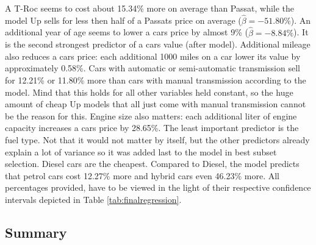 \documentclass[12 pt]{scrartcl}
\begin{document}
A T-Roc seems to cost about 15.34\% more on average than Passat, while the model Up sells for less then half of a Passats price on average ($\hat{\beta} = -51.80\%$). An additional year of age seems to lower a cars price by almost 9\% ($\hat{\beta} = -8.84\%$). It is the second strongest predictor of a cars value (after model). Additional mileage also reduces a cars price: each additional 1000 miles on a car lower its value by approximately 0.58\%. Cars with
automatic or semi-automatic transmission sell for 12.21\% or 11.80\% more than cars with manual transmission according to the model. Mind that this holds for all other variables held constant, so the huge amount of cheap Up models that all just come with manual transmission cannot be the reason for this.
Engine size also matters: each additional liter of engine capacity increases a cars price by 28.65\%. The least important predictor is the fuel type. Not that it would not matter by itself, but the other predictors already explain a lot of variance so it was added last to the model in best subset selection.
Diesel cars are the cheapest. Compared to Diesel, the model predicts that petrol cars cost 12.27\% more and hybrid cars even 46.23\% more.
All percentages provided, have to be viewed in the light of their respective confidence intervals depicted in Table \ref{tab:finalregression}.

\subsection{Summary}
\end{document}
